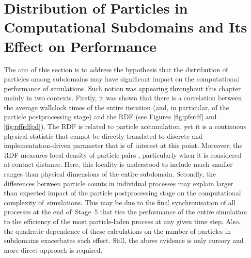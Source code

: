 \documentclass{pracamgren}
\begin{document}
 

\section{Distribution of Particles in Computational Subdomains and Its Effect on Performance}
\label{sc:ch3.perfp}


The aim of this section is to address the hypothesis that the distribution of particles among subdomains may have significant impact on the computational performance of simulations.
Such notion was appearing throughout this chapter mainly in two contexts.
Firstly, it was shown that there is a correlation between the average wallclock times of the entire iteration (and, in particular, of the particle postprocessing stage) and the RDF (see Figures \ref{fig:pfsrdf} and \ref{fig:pffrdfpd}).
The RDF is related to particle accumulation, yet it is a continuous physical statistic that cannot be directly translated to discrete and implementation-driven parameter that is of~interest at this point.
Moreover, the RDF measures local density of particle pairs \parencite{Grabowski2013}, particularly when it is considered at contact distance.
Here, this locality is understood to include much smaller ranges than physical dimensions of the entire subdomain.   
Secondly, the differences between particle counts in individual processes may explain larger than expected impact of the particle postprocessing stage on the computational complexity of~simulations.
This may be due to the final synchronisation of all processes at the end of~Stage~5 that ties the performance of the entire simulation to the efficiency of the most particle-laden process at any given time step.
Also, the quadratic dependence of these calculations on the number of particles in subdomains exacerbates such effect.
Still, the above evidence is only cursory and more direct approach is required.
\end{document}
